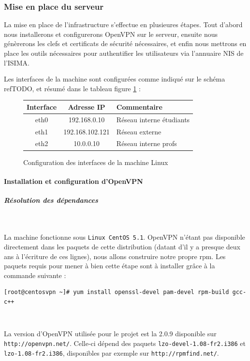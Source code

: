 \subsubsection{Mise en place du serveur}

La mise en place de l'infrastructure s'effectue en plusieures étapes. Tout d'abord nous installerons et configurerons OpenVPN sur le serveur, ensuite nous génèrerons les clefs et certificats de sécurité nécessaires, et enfin nous mettrons en place les outils nécessaires pour authentifier les utilisateurs via l'annuaire NIS de l'ISIMA.

Les interfaces de la machine sont configurées comme indiqué sur le schéma ref{TODO}, et résumé dans le tableau figure \ref{linux_interfaces} :

\begin{figure}[H]
	\begin{center}
		\begin{tabular}{c|c|l}
			Interface & Adresse IP & Commentaire \\
			\hline
			eth0 & 192.168.0.10 & Réseau interne étudiants \\
			eth1 & 192.168.102.121 & Réseau externe \\
			eth2 & 10.0.0.10 & Réseau interne profs \\
		\end{tabular}
	\end{center}
	\caption{Configuration des interfaces de la machine Linux}
	\label{linux_interfaces}
\end{figure}


\paragraph{Installation et configuration d'OpenVPN}

\subparagraph{Résolution des dépendances}
~

La machine fonctionne sous \texttt{Linux CentOS 5.1}. OpenVPN n'étant pas disponible directement dans les paquets de cette distribution (datant d'il y a presque deux ans à l'écriture de ces lignes), nous allons construire notre propre rpm. Les paquets requis pour mener à bien cette étape sont à installer grâce à la commande suivante :

\verb|[root@centosvpn ~]# yum install openssl-devel pam-devel rpm-build gcc-c++|

~

La version d'OpenVPN utilisée pour le projet est la 2.0.9 disponible sur \verb|http://openvpn.net/|. Celle-ci dépend des paquets \verb|lzo-devel-1.08-fr2.i386| et \verb|lzo-1.08-fr2.i386|, disponibles par exemple sur \verb|http://rpmfind.net/|.

